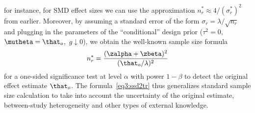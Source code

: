for instance, for SMD effect sizes we can use the approximation
$n_{r}^{*} \approx 4/(\sigma^*_{r})^{2}$ from
earlier. %
Moreover, by assuming a standard error of the form
$\sigma_{r} = \lambda/\sqrt{n_{r}}$ and plugging in the parameters of the
``conditional'' design prior %
\mbox{($\tau^{2} = 0$, $\mutheta = \that_{o}$, $g \downarrow 0$)}, we obtain the
well-known sample size formula \citep[ch. 3.3]{Matthews2006}
\begin{align*}
  n_{r}^{*} = \frac{(\zalpha + \zbeta)^{2}}{(\that_{o}/\lambda)^{2}}
\end{align*}
for a one-sided significance test at level $\alpha$ with power $1 - \beta$ to
detect the original effect estimate $\that_{o}$. The formula~\eqref{eq3:ssd2tr}
thus generalizes standard sample size calculation to take into account the
uncertainty of the original estimate, between-study heterogeneity and other
types of external knowledge.


